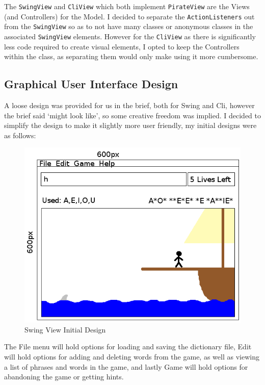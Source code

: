 \documentclass[a4paper, 11pt]{article}
\begin{document}
The \texttt{SwingView} and \texttt{CliView} which both implement \texttt{PirateView} are the Views (and Controllers) for the Model. I decided to separate the \texttt{ActionListeners} out from the \texttt{SwingView} so as to not have many classes or anonymous classes in the associated \texttt{SwingView} elements. However for the \texttt{CliView} as there is significantly less code required to create visual elements, I opted to keep the Controllers within the class, as separating them would only make using it more cumbersome. 

\subsection{Graphical User Interface Design}

A loose design was provided for us in the brief, both for Swing and Cli, however the brief said `might look like', so some creative freedom was implied. I decided to simplify the design to make it slightly more user friendly, my initial designs were as follows:

\begin{figure}[H]
\centering
\includegraphics[scale=0.5]{./res/SwingViewDesign.png}
\caption{Swing View Initial Design}
\label{SwingView}
\end{figure}

The File menu will hold options for loading and saving the dictionary file, Edit will hold options for adding and deleting words from the game, as well as viewing a list of phrases and words in the game, and lastly Game will hold options for abandoning the game or getting hints.
\end{document}
